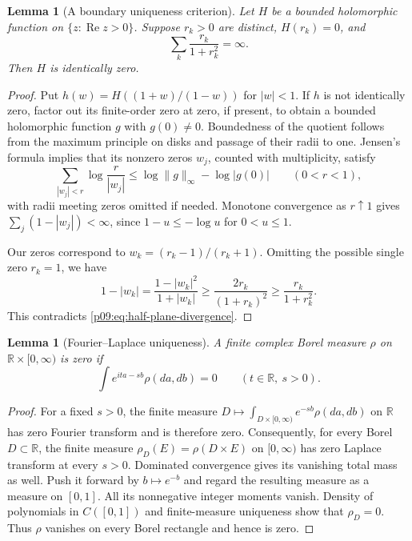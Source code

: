 \documentclass[11pt,letterpaper]{article}
\newtheorem{lemma}[theorem]{Lemma}
\theoremstyle{definition}
\theoremstyle{remark}
\renewcommand{\Re}{\operatorname{Re}}
\newcommand{\1}{\mathbf 1}
\begin{document}
\begin{lemma}[A boundary uniqueness criterion]
\label{p09:lem:half-plane-zeros}
Let $H$ be a bounded holomorphic function on $\{z:\Re z>0\}$.
Suppose $r_k>0$ are distinct, $H(r_k)=0$, and
\begin{equation}\label{p09:eq:half-plane-divergence}
                   \sum_k\frac{r_k}{1+r_k^2}=\infty.
\end{equation}
Then $H$ is identically zero.
\end{lemma}
\begin{proof}
Put $h(w)=H((1+w)/(1-w))$ for $|w|<1$. If $h$ is not identically
zero, factor out its finite-order zero at zero, if present, to obtain
a bounded holomorphic function $g$ with $g(0)\ne0$. Boundedness of
the quotient follows from the maximum principle on disks and passage
of their radii to one. Jensen's formula implies that its nonzero
zeros $w_j$, counted with multiplicity, satisfy
\[
 \sum_{|w_j|<r}\log\frac r{|w_j|}
 \leq\log\|g\|_\infty-\log|g(0)|
 \qquad(0<r<1),
\]
with radii meeting zeros omitted if needed. Monotone convergence as
$r\uparrow1$ gives $\sum_j(1-|w_j|)<\infty$, since
$1-u\leq-\log u$ for $0<u\leq1$.

Our zeros correspond to $w_k=(r_k-1)/(r_k+1)$. Omitting the possible
single zero $r_k=1$, we have
\[
 1-|w_k|
 =\frac{1-|w_k|^2}{1+|w_k|}
 \geq\frac{2r_k}{(1+r_k)^2}
 \geq\frac{r_k}{1+r_k^2}.
\]
This contradicts \eqref{p09:eq:half-plane-divergence}.
\end{proof}

\begin{lemma}[Fourier--Laplace uniqueness]
\label{p09:lem:fourier-laplace}
A finite complex Borel measure $\rho$ on
$\mathbb R\times[0,\infty)$ is zero if
\begin{equation}\label{p09:eq:FL-zero}
       \int e^{ita-sb}\rho(da,db)=0
              \qquad(t\in\mathbb R,\ s>0).
\end{equation}
\end{lemma}
\begin{proof}
For a fixed $s>0$, the finite measure
$D\mapsto\int_{D\times[0,\infty)}e^{-sb}\rho(da,db)$ on
$\mathbb R$ has zero Fourier transform and is therefore zero.
Consequently, for every Borel $D\subset\mathbb R$, the finite measure
$\rho_D(E)=\rho(D\times E)$ on $[0,\infty)$ has zero Laplace
transform at every $s>0$. Dominated convergence gives its vanishing
total mass as well. Push it forward by $b\mapsto e^{-b}$ and regard
the resulting measure as a measure on $[0,1]$. All its nonnegative
integer moments vanish. Density of polynomials in $C([0,1])$ and
finite-measure uniqueness show that $\rho_D=0$. Thus $\rho$ vanishes
on every Borel rectangle and hence is zero.
\end{proof}
\end{document}
